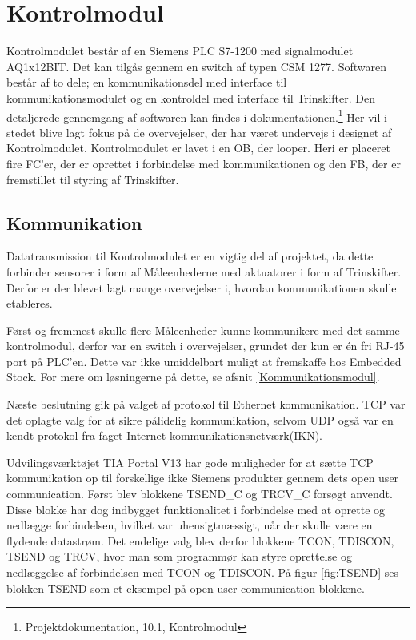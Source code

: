 
\section{Kontrolmodul}

Kontrolmodulet består af en Siemens PLC S7-1200 med signalmodulet AQ1x12BIT. Det kan tilgås gennem en switch af typen CSM 1277.
Softwaren består af to dele; en kommunikationsdel med interface til kommunikationsmodulet og en kontroldel med interface til Trinskifter. Den detaljerede gennemgang af softwaren kan findes i dokumentationen.\footnote{Projektdokumentation, 10.1, Kontrolmodul} Her vil i stedet blive lagt fokus på de overvejelser, der har været undervejs i designet af Kontrolmodulet.
Kontrolmodulet er lavet i en OB, der looper. Heri er placeret fire FC'er, der er oprettet i forbindelse med kommunikationen og den FB, der er fremstillet til styring af Trinskifter.

\subsection{Kommunikation}
Datatransmission til Kontrolmodulet er en vigtig del af projektet, da dette forbinder sensorer i form af Måleenhederne med aktuatorer i form af Trinskifter. Derfor er der blevet lagt mange overvejelser i, hvordan kommunikationen skulle etableres.


Først og fremmest skulle flere Måleenheder kunne kommunikere med det samme kontrolmodul, derfor var en switch i overvejelser, grundet der kun er én fri RJ-45 port på PLC'en. Dette var ikke umiddelbart muligt at fremskaffe hos Embedded Stock. For mere om løsningerne på dette, se afsnit \ref{Kommunikationsmodul}.


Næste beslutning gik på valget af protokol til Ethernet kommunikation. TCP var det oplagte valg for at sikre pålidelig kommunikation, selvom UDP også var en kendt protokol fra faget Internet kommunikationsnetværk(IKN).


Udvilingsværktøjet TIA Portal V13 har gode muligheder for at sætte TCP kommunikation op til forskellige ikke Siemens produkter gennem dets open user communication. Først blev blokkene TSEND\_C og TRCV\_C forsøgt anvendt. Disse blokke har dog indbygget funktionalitet i forbindelse med at oprette og nedlægge forbindelsen, hvilket var uhensigtmæssigt, når der skulle være en flydende datastrøm. Det endelige valg blev derfor blokkene TCON, TDISCON, TSEND og TRCV, hvor man som programmør kan styre oprettelse og nedlæggelse af forbindelsen med TCON og TDISCON. På figur \ref{fig:TSEND} ses blokken TSEND som et eksempel på open user communication blokkene.

